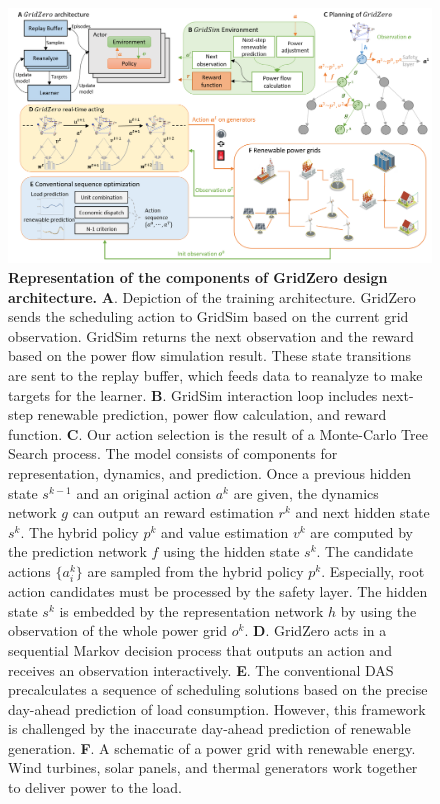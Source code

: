 \begin{figure}[h]
  \centering
  \includegraphics[width=0.85\linewidth]{fig/nature_fig1.png}
  \caption{\textbf{Representation of the components of GridZero design architecture.}
  \textbf{A}. Depiction of the training architecture. GridZero sends the scheduling action to GridSim based on the current grid observation. GridSim returns the next observation and the reward based on the power flow simulation result. These state transitions are sent to the replay buffer, which feeds data to reanalyze to make targets for the learner.
  \textbf{B}. GridSim interaction loop includes next-step renewable prediction, power flow calculation, and reward function.
  \textbf{C}. Our action selection is the result of a Monte-Carlo Tree Search process. The model consists of components for representation, dynamics, and prediction. Once a previous hidden state $s^{k-1}$ and an original action $a^k$ are given, the dynamics network $g$ can output an reward estimation $r^k$ and next hidden state $s^k$. The hybrid policy $p^k$ and value estimation $v^k$ are computed by the prediction network $f$ using the hidden state $s^k$. The candidate actions $\{a^k_i\}$ are sampled from the hybrid policy $p^k$. Especially, root action candidates must be processed by the safety layer. The hidden state $s^k$ is embedded by the representation network $h$ by using the observation of the whole power grid $o^k$.
  \textbf{D}. GridZero acts in a sequential Markov decision process that outputs an action and receives an observation interactively. 
  \textbf{E}. The conventional DAS precalculates a sequence of scheduling solutions based on the precise day-ahead prediction of load consumption. However, this framework is challenged by the inaccurate day-ahead prediction of renewable generation.
  \textbf{F}. A schematic of a power grid with renewable energy. Wind turbines, solar panels, and thermal generators work together to deliver power to the load. 
  } 
  \label{fig:nature_fig1}
\end{figure}



